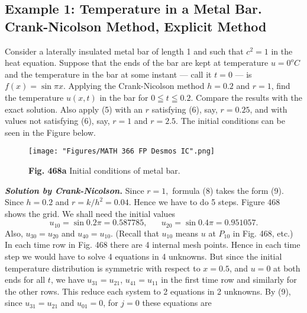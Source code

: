 \subsection*{\small{\textbf{\color{blue} Example 1:}} \textbf{Temperature in a Metal Bar. Crank-Nicolson Method, Explicit Method}}
Consider a laterally insulated metal bar of length 1 and such that $c^2=1$ in the heat equation. Suppose that the ends of the bar are kept at temperature $u=0^{o}C$ and the temperature in the bar at some instant --- call it $t=0$ --- is $f(x)=\sin{\pi x}$. Applying the Crank-Nicolson method $h=0.2$ and $r=1$, find the temperature $u(x,t)$ in the bar for $0\leqq t \leqq 0.2$. Compare the results with the exact solution. Also apply (5) with an $r$ satisfying (6), say, $r=0.25$, and with values not satisfying (6), say, $r=1$ and $r=2.5$. The initial conditions can be seen in the Figure below.
\begin{figure}[htbp]
\begin{center}
\texttt{[image: "Figures/MATH 366 FP Desmos IC".png]}
\caption*{\small{\textbf{\color{blue} Fig. 468a}} Initial conditions of metal bar.}
\end{center}
\end{figure}
\newline
\newline
\textit{\textbf{Solution by Crank-Nicolson.}}\hspace{10pt} Since $r=1,$ formula (8) takes the form (9). Since $h=0.2$ and $r=k/h^2=0.04.$ Hence we have to do 5 steps. Figure 468 shows the grid. We shall need the initial values
\begin{equation*}
u_{10}=\sin{0.2\pi}=0.587785, \hspace{20pt} u_{20}=\sin{0.4\pi}=0.951057.
\end{equation*}
Also, $u_{30}=u_{20}$ and $u_{40}=u_{10}$. (Recall that $u_{10}$ means $u$ at $P_{10}$ in Fig. 468, etc.) In each time row in Fig. 468 there are 4 internal mesh points. Hence in each time step we would have to solve 4 equations in 4 unknowns. But since the initial temperature distribution is symmetric with respect to $x=0.5$, and $u=0$ at both ends for all $t$, we have $u_{31}=u_{21}$, $u_{41}=u_{11}$ in the first time row and similarly for the other rows. This reduce each system to 2 equations in 2 unknowns. By (9), since $u_{31}=u_{21}$ and $u_{01}=0$, for $j=0$ these equations are
